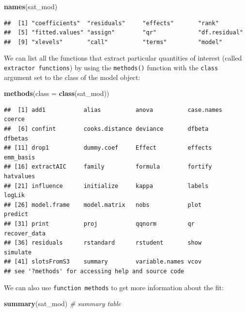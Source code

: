 \documentclass[
]{book}
\newenvironment{Shaded}{\begin{snugshade}}{\end{snugshade}}
\newcommand{\CommentTok}[1]{\textcolor[rgb]{0.56,0.35,0.01}{\textit{#1}}}
\newcommand{\DataTypeTok}[1]{\textcolor[rgb]{0.13,0.29,0.53}{#1}}
\newcommand{\KeywordTok}[1]{\textcolor[rgb]{0.13,0.29,0.53}{\textbf{#1}}}
\newcommand{\NormalTok}[1]{#1}
\begin{document}
\begin{Shaded}
\begin{Highlighting}[]
  \KeywordTok{names}\NormalTok{(sat\_mod)}
\end{Highlighting}
\end{Shaded}

\begin{verbatim}
##  [1] "coefficients"  "residuals"     "effects"       "rank"         
##  [5] "fitted.values" "assign"        "qr"            "df.residual"  
##  [9] "xlevels"       "call"          "terms"         "model"
\end{verbatim}

We can list all the functions that extract particular quantities of interest (called \texttt{extractor\ functions}) by using the \texttt{methods()} function with the \texttt{class} argument set to the class of the model object:

\begin{Shaded}
\begin{Highlighting}[]
\KeywordTok{methods}\NormalTok{(}\DataTypeTok{class =} \KeywordTok{class}\NormalTok{(sat\_mod))}
\end{Highlighting}
\end{Shaded}

\begin{verbatim}
##  [1] add1           alias          anova          case.names     coerce        
##  [6] confint        cooks.distance deviance       dfbeta         dfbetas       
## [11] drop1          dummy.coef     Effect         effects        emm_basis     
## [16] extractAIC     family         formula        fortify        hatvalues     
## [21] influence      initialize     kappa          labels         logLik        
## [26] model.frame    model.matrix   nobs           plot           predict       
## [31] print          proj           qqnorm         qr             recover_data  
## [36] residuals      rstandard      rstudent       show           simulate      
## [41] slotsFromS3    summary        variable.names vcov          
## see '?methods' for accessing help and source code
\end{verbatim}

We can also use \texttt{function\ methods} to get more information about the fit:

\begin{Shaded}
\begin{Highlighting}[]
  \KeywordTok{summary}\NormalTok{(sat\_mod) }\CommentTok{\# summary table}
\end{Highlighting}
\end{Shaded}
\end{document}

